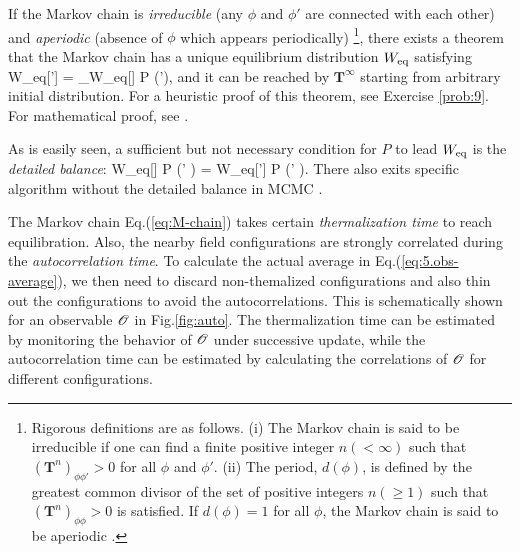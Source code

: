 If  the Markov chain is {\it irreducible} (any $\phi$ and $\phi'$ are connected with each other) and  {\it aperiodic}
(absence of $\phi$ which appears periodically) \footnote{Rigorous definitions are as follows. (i) The Markov chain is said to be 
irreducible if one can find a finite positive integer $n (< \infty)$  such that  $(\mathbf{T}^n)_{\phi \phi'} > 0 $ for all $\phi$ and $\phi'$.
(ii)  The period, $d(\phi)$, is defined by the greatest common divisor  of the set of positive integers $n (\ge 1)$
such that  $(\mathbf{T}^n)_{\phi \phi} > 0 $ is satisfied. If $d(\phi)=1$ for all $\phi$, the Markov chain is 
said to be aperiodic \cite{Haggstrom:2002}.},  there exists a theorem that the Markov chain
 has a unique equilibrium distribution $W_{\rm eq}$ satisfying 
\beq
\label{eq:transition-W}
W_{\rm eq}[\phi']  =  \sum_\phi W_{\rm eq}[\phi] P (\phi \rightarrow \phi'),
\eeq
and it can be reached by $\mathbf{T}^{\infty}$ starting from arbitrary initial distribution.
For a heuristic proof of this theorem, see Exercise \ref{prob:9}. For mathematical proof,  see  \cite{Haggstrom:2002}.

As is easily seen, a  sufficient but not necessary condition for $P$ to lead $W_{\rm eq}$  is the {\it detailed balance}:
\beq
\label{eq:5.det-balance}
W_{\rm eq}[\phi] P (\phi \rightarrow \phi' )  =
 W_{\rm eq}[\phi'] P (\phi' \rightarrow \phi ).
\eeq
There also exits specific algorithm without the detailed balance in MCMC  \cite{SuwaTodo:2010}.


The Markov chain Eq.(\ref{eq:M-chain})  takes 
certain {\it thermalization time} to reach equilibration. 
Also, the nearby  field configurations  are strongly correlated  during the {\it autocorrelation time}.
To calculate the actual average in Eq.(\ref{eq:5.obs-average}), we then 
need to discard non-themalized configurations and also 
thin out the configurations to avoid the autocorrelations. 
This is schematically shown for an observable ${\cal O}$ in Fig.\ref{fig:auto}.
The thermalization time can be estimated by monitoring the behavior of ${\cal O}$  under 
successive update, while the autocorrelation time can be estimated by 
calculating the correlations of ${\cal O}$ for different configurations.

